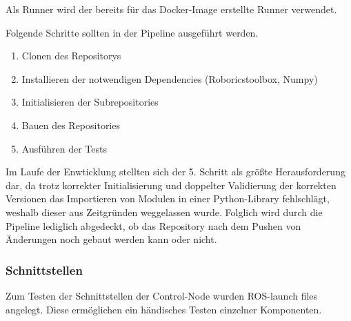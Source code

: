 Als Runner wird der bereits für das Docker-Image erstellte Runner verwendet.  

Folgende Schritte sollten in der Pipeline ausgeführt werden.

\begin{enumerate}
    \item Clonen des Repositorys
    \item Installieren der notwendigen Dependencies (Roboricstoolbox, Numpy)
    \item Initialisieren der Subrepositories
    \item Bauen des Repositories
    \item Ausführen der Tests
\end{enumerate}

Im Laufe der Enwticklung stellten sich der 5. Schritt als größte Herausforderung dar, da trotz korrekter Initialisierung und doppelter Validierung der korrekten Versionen das Importieren von Modulen in einer Python-Library fehlschlägt, weshalb dieser aus Zeitgründen weggelassen wurde. Folglich wird durch die Pipeline lediglich abgedeckt, ob das Repository nach dem Pushen von Änderungen noch gebaut werden kann oder nicht. 
\\

\subsubsection[Schnittstellen]{Schnittstellen }

Zum Testen der Schnittstellen der Control-Node wurden ROS-launch files angelegt. Diese ermöglichen ein händisches Testen einzelner Komponenten.
\\
